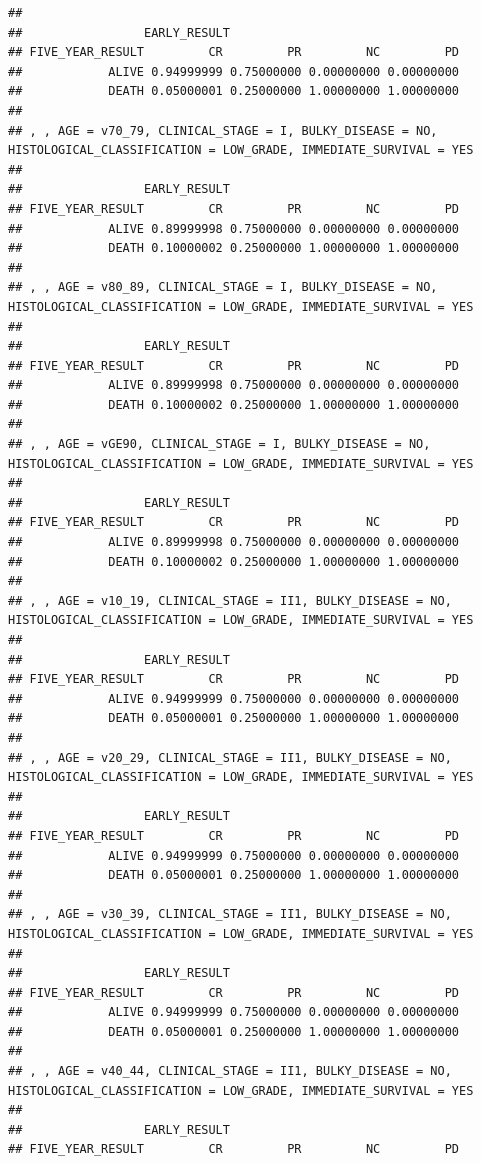 \documentclass[]{article}
\begin{document}
\begin{verbatim}
## 
##                 EARLY_RESULT
## FIVE_YEAR_RESULT         CR         PR         NC         PD
##            ALIVE 0.94999999 0.75000000 0.00000000 0.00000000
##            DEATH 0.05000001 0.25000000 1.00000000 1.00000000
## 
## , , AGE = v70_79, CLINICAL_STAGE = I, BULKY_DISEASE = NO, HISTOLOGICAL_CLASSIFICATION = LOW_GRADE, IMMEDIATE_SURVIVAL = YES
## 
##                 EARLY_RESULT
## FIVE_YEAR_RESULT         CR         PR         NC         PD
##            ALIVE 0.89999998 0.75000000 0.00000000 0.00000000
##            DEATH 0.10000002 0.25000000 1.00000000 1.00000000
## 
## , , AGE = v80_89, CLINICAL_STAGE = I, BULKY_DISEASE = NO, HISTOLOGICAL_CLASSIFICATION = LOW_GRADE, IMMEDIATE_SURVIVAL = YES
## 
##                 EARLY_RESULT
## FIVE_YEAR_RESULT         CR         PR         NC         PD
##            ALIVE 0.89999998 0.75000000 0.00000000 0.00000000
##            DEATH 0.10000002 0.25000000 1.00000000 1.00000000
## 
## , , AGE = vGE90, CLINICAL_STAGE = I, BULKY_DISEASE = NO, HISTOLOGICAL_CLASSIFICATION = LOW_GRADE, IMMEDIATE_SURVIVAL = YES
## 
##                 EARLY_RESULT
## FIVE_YEAR_RESULT         CR         PR         NC         PD
##            ALIVE 0.89999998 0.75000000 0.00000000 0.00000000
##            DEATH 0.10000002 0.25000000 1.00000000 1.00000000
## 
## , , AGE = v10_19, CLINICAL_STAGE = II1, BULKY_DISEASE = NO, HISTOLOGICAL_CLASSIFICATION = LOW_GRADE, IMMEDIATE_SURVIVAL = YES
## 
##                 EARLY_RESULT
## FIVE_YEAR_RESULT         CR         PR         NC         PD
##            ALIVE 0.94999999 0.75000000 0.00000000 0.00000000
##            DEATH 0.05000001 0.25000000 1.00000000 1.00000000
## 
## , , AGE = v20_29, CLINICAL_STAGE = II1, BULKY_DISEASE = NO, HISTOLOGICAL_CLASSIFICATION = LOW_GRADE, IMMEDIATE_SURVIVAL = YES
## 
##                 EARLY_RESULT
## FIVE_YEAR_RESULT         CR         PR         NC         PD
##            ALIVE 0.94999999 0.75000000 0.00000000 0.00000000
##            DEATH 0.05000001 0.25000000 1.00000000 1.00000000
## 
## , , AGE = v30_39, CLINICAL_STAGE = II1, BULKY_DISEASE = NO, HISTOLOGICAL_CLASSIFICATION = LOW_GRADE, IMMEDIATE_SURVIVAL = YES
## 
##                 EARLY_RESULT
## FIVE_YEAR_RESULT         CR         PR         NC         PD
##            ALIVE 0.94999999 0.75000000 0.00000000 0.00000000
##            DEATH 0.05000001 0.25000000 1.00000000 1.00000000
## 
## , , AGE = v40_44, CLINICAL_STAGE = II1, BULKY_DISEASE = NO, HISTOLOGICAL_CLASSIFICATION = LOW_GRADE, IMMEDIATE_SURVIVAL = YES
## 
##                 EARLY_RESULT
## FIVE_YEAR_RESULT         CR         PR         NC         PD

\end{verbatim}
\end{document}
